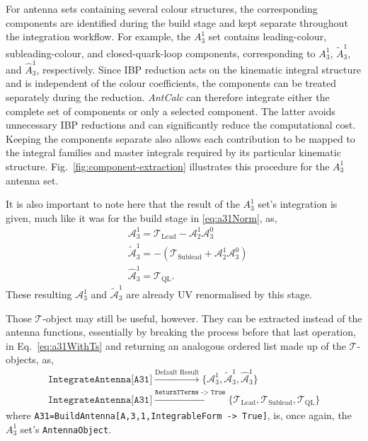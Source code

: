 For antenna sets containing several colour structures, the corresponding components are
identified during the build stage and kept separate throughout the integration workflow. For
example, the $A_3^1$ set contains leading-colour, subleading-colour, and closed-quark-loop
components, corresponding to $A_3^1$, $\tilde A_3^1$, and $\hat A_3^1$, respectively. Since IBP
reduction acts on the kinematic integral structure and is independent of the colour
coefficients, the components can be treated separately during the reduction. \textit{AntCalc}
can therefore integrate either the complete set of components or only a selected component. The
latter avoids unnecessary IBP reductions and can significantly reduce the computational cost.
Keeping the components separate also allows each contribution to be mapped to the integral
families and master integrals required by its particular kinematic structure.
Fig.~\ref{fig:component-extraction} illustrates this procedure for the $A_3^1$ antenna set.



It is also important to note here that the result of the $A_3^1$ set's 
integration is given, much like it was for the build stage in \eqref{eq:a31Norm}, as,
\begin{equation}\label{eq:a31WithTs}
    \begin{split}
        &\mathcal A_3^1 = \mathcal T_\text{Lead} - \mathcal A_2^1\mathcal A_3^0\\
        &\tilde{\mathcal A}_3^1 = -\left(\mathcal T_\text{Sublead} + \mathcal A_2^1\mathcal A_3^0\right)\\
        &\hat{\mathcal A}_3^1 = \mathcal T_\text{QL}.
    \end{split}
\end{equation}
These resulting $\mathcal A_3^1$ and $\tilde{\mathcal A}_3^1$ are already
UV renormalised by this stage.

Those $\mathcal T$-object may still be useful, however. They can be extracted instead of the 
antenna functions, essentially by breaking the process before that last operation, in 
Eq.~\eqref{eq:a31WithTs} and returning an analogous ordered list made up of the $\mathcal T$-objects,
as,
\begin{equation}
    \begin{gathered}
        \texttt{IntegrateAntenna[A31]} \xrightarrow{\text{Default Result}} \{\mathcal A_3^1, \tilde{\mathcal A}_3^1, \hat{\mathcal A}_3^1\}\\
        \texttt{IntegrateAntenna[A31]} \xrightarrow{\texttt{ReturnTTerms -> True}} \{\mathcal T_\text{Lead}, \mathcal T_\text{Sublead}, \mathcal T_\text{QL}\}
    \end{gathered}
\end{equation}
where \texttt{A31=BuildAntenna[A,3,1,IntegrableForm -> True]}, is, once again, the $A_3^1$ set's
\texttt{AntennaObject}.

